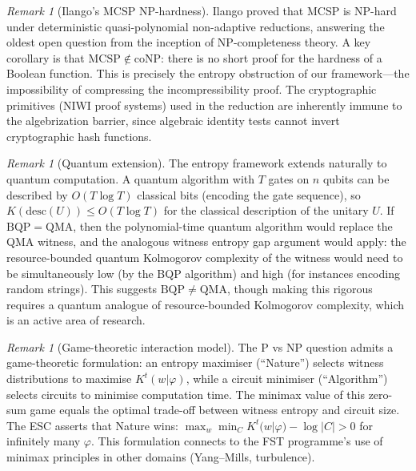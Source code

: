 \documentclass[aps,prd,twocolumn,superscriptaddress,nofootinbib]{revtex4-2}
\theoremstyle{definition}
\theoremstyle{remark}
\newtheorem{remark}[theorem]{Remark}
\begin{document}
\begin{remark}[Ilango's MCSP NP-hardness]\label{rem:ilango-mcsp}
Ilango \cite{Ilango2025} proved that MCSP is NP-hard under deterministic quasi-polynomial non-adaptive reductions, answering the oldest open question from the inception of NP-completeness theory. A key corollary is that $\mathrm{MCSP} \notin \mathrm{coNP}$: there is no short proof for the hardness of a Boolean function. This is precisely the entropy obstruction of our framework---the impossibility of compressing the incompressibility proof. The cryptographic primitives (NIWI proof systems) used in the reduction are inherently immune to the algebrization barrier, since algebraic identity tests cannot invert cryptographic hash functions.
\end{remark}

\begin{remark}[Quantum extension]
\label{rem:quantum}
The entropy framework extends naturally to quantum computation. A quantum algorithm with $T$ gates on $n$ qubits can be described by $O(T \log T)$ classical bits (encoding the gate sequence), so $K(\mathrm{desc}(U)) \leq O(T \log T)$ for the classical description of the unitary $U$. If $\mathrm{BQP} = \mathrm{QMA}$, then the polynomial-time quantum algorithm would replace the QMA witness, and the analogous witness entropy gap argument would apply: the resource-bounded quantum Kolmogorov complexity of the witness would need to be simultaneously low (by the BQP algorithm) and high (for instances encoding random strings). This suggests $\mathrm{BQP} \neq \mathrm{QMA}$, though making this rigorous requires a quantum analogue of resource-bounded Kolmogorov complexity, which is an active area of research.
\end{remark}

\begin{remark}[Game-theoretic interaction model]
\label{rem:game-theoretic}
The P vs NP question admits a game-theoretic formulation: an entropy maximiser (``Nature'') selects witness distributions to maximise $K^t(w|\varphi)$, while a circuit minimiser (``Algorithm'') selects circuits to minimise computation time. The minimax value of this zero-sum game equals the optimal trade-off between witness entropy and circuit size. The ESC asserts that Nature wins: $\max_w \min_C K^t(w|\varphi) - \log |C| > 0$ for infinitely many $\varphi$. This formulation connects to the FST programme's use of minimax principles in other domains (Yang--Mills, turbulence).
\end{remark}
\end{document}

